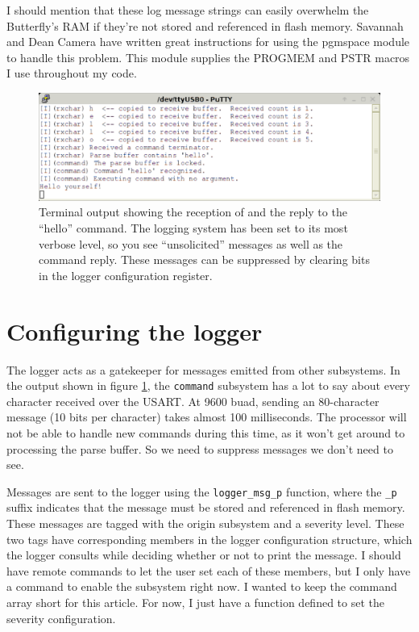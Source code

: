 I should mention that these log message strings can easily overwhelm the Butterfly's RAM if they're not stored and referenced in flash memory.  Savannah\cite{url:savannah:pgmspace} and Dean Camera\cite{url:deancamera:pgmspace} have written great instructions for using the pgmspace module to handle this problem.  This module supplies the PROGMEM and PSTR macros I use throughout my code.

\begin{figure}[ht]
    \begin{center}
        \includegraphics[clip,scale=0.5]{pngs/hellotrace.eps}
        \caption{Terminal output showing the reception of and the reply to the ``hello'' command.  The logging system has been set to its most verbose level, so you see ``unsolicited'' messages as well as the command reply.  These messages can be suppressed by clearing bits in the logger configuration register.\label{fig:hellotrace}}
    \end{center}
\end{figure}

\clearpage{}
\section{Configuring the logger}
The logger acts as a gatekeeper for messages emitted from other subsystems.  In the output shown in figure \ref{fig:hellotrace}, the \texttt{command} subsystem has a lot to say about every character received over the USART.  At 9600 buad, sending an 80-character message (10 bits per character) takes almost 100 milliseconds.  The processor will not be able to handle new commands during this time, as it won't get around to processing the parse buffer.  So we need to suppress messages we don't need to see.  

Messages are sent to the logger using the \texttt{logger\_msg\_p} function, where the \texttt{\_p} suffix indicates that the message must be stored and referenced in flash memory.  These messages are tagged with the origin subsystem and a severity level.  These two tags have corresponding members in the logger configuration structure, which the logger consults while deciding whether or not to print the message.  I should have remote commands to let the user set each of these members, but I only have a command to enable the subsystem right now.  I wanted to keep the command array short for this article.  For now, I just have a function defined to set the severity configuration.   

